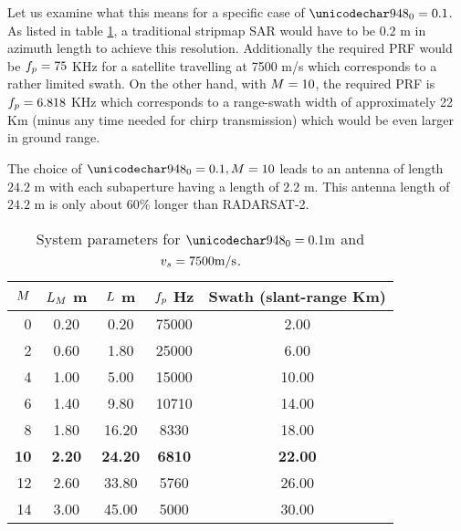 Let us examine what this means for a specific case of $\resxDesired = 0.1$. As listed in table \ref{tb:Simulation}, a traditional stripmap SAR would have to be $0.2$ m in azimuth length to achieve this resolution. Additionally the required PRF would be $f_p = 75$ KHz for a satellite travelling at 7500 m/s which corresponds to a rather limited swath. On the other hand, with $M=10$, the required PRF is $f_p = 6.818$ KHz which corresponds to a range-swath width of approximately 22 Km (minus any time needed for chirp transmission) which would be even larger in ground range.
\par
The choice of $\resxDesired=0.1, \channelM=10$ leads to an antenna of length $24.2$ m with each subaperture having a length of $2.2$ m. This antenna length of $24.2$ m is only about $60$\% longer than RADARSAT-2.
\begin{table}[h!]
\begin{center}
\caption{System parameters for $\resxDesired=0.1 \text{m}$ and $v_s=7500 \text{m/s}$.}
\label{tb:Simulation}
 \begin{tabular}{r|c|c|c|c}\\\hline
  {\bf $M$} & {\bf $L_M$ m} & {\bf $L$ m} & {\bf $f_p$ Hz} & {\bf Swath (slant-range Km)}\\\hline 
0 & 0.20 & 0.20 & 75000 & 2.00\\\hline
2 & 0.60 & 1.80 & 25000 & 6.00\\\hline
4 & 1.00 & 5.00 & 15000 & 10.00\\\hline
6 & 1.40 & 9.80 & 10710 & 14.00\\\hline
8 & 1.80 & 16.20 & 8330 & 18.00\\\hline
{\bf 10} & {\bf 2.20} & {\bf 24.20} & {\bf 6810} & {\bf 22.00}\\\hline
12 & 2.60 & 33.80 & 5760 & 26.00\\\hline
14 & 3.00 & 45.00 & 5000 & 30.00\\\hline
 \end{tabular}
 \end{center}
\end{table}
